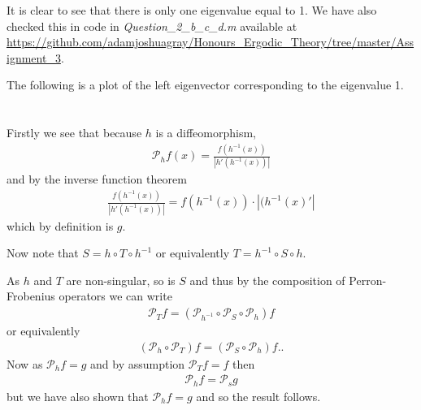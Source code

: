 \documentclass{unswmaths}
\begin{document}
It is clear to see that there is only one eigenvalue equal to 1. We have also checked this in code in \emph{Question\_2\_b\_c\_d.m} available at \url{https://github.com/adamjoshuagray/Honours_Ergodic_Theory/tree/master/Assignment_3}.

The following is a plot of the left eigenvector corresponding to the eigenvalue 1.

\section{}
\subsection{}

Firstly we see that because $ h $ is a diffeomorphism,
\begin{align}
	\mathcal{P}_h f(x) = \frac{f(h^{-1}(x))}{|h'(h^{-1}(x))|}
\end{align}
and by the inverse function theorem
\begin{align}
	\frac{f(h^{-1}(x))}{|h'(h^{-1}(x))|} = f(h^{-1}(x)) \cdot |(h^{-1}(x)'|
\end{align}
which by definition is $ g $. 

Now note that $ S = h \circ T \circ h^{-1} $ or equivalently $ T = h^{-1} \circ S \circ h $.

As $ h $ and $ T $ are non-singular, so is $ S $ and thus by the composition of Perron-Frobenius operators
we can write
\begin{align}
    \mathcal{P}_T f = \left( \mathcal{P}_{h^{-1}} \circ \mathcal{P}_{S} \circ \mathcal{P}_{h} \right) f
\end{align}
or equivalently
\begin{align}
    \left( \mathcal{P}_{h} \circ \mathcal{P}_T \right) f = \left( \mathcal{P}_{S} \circ \mathcal{P}_{h} \right) f..
\end{align}
Now as $ \mathcal{P}_h f = g $ and by assumption $ \mathcal{P}_T f = f $ then
\begin{align}
    \mathcal{P}_h f = \mathcal{P}_s g
\end{align}
but we have also shown that $ \mathcal{P}_h f = g $
and so the result follows.
\end{document}
